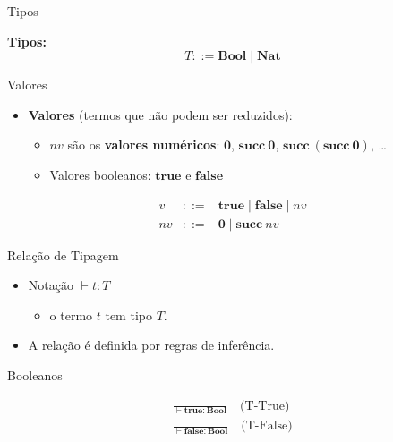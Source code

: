 \begin{frame}{Tipos}

    \textbf{Tipos:} \[T ::= \mathbf{Bool} \mid \mathbf{Nat}\]
\end{frame}

\begin{frame}{Valores}

    \begin{itemize}

        \item
        \textbf{Valores} (termos que não podem ser reduzidos):

        \begin{itemize}

            \item
            \(nv\) são os \textbf{valores numéricos}: \(\mathbf{0}\),
            \(\mathbf{succ}\ \mathbf{0}\),
            \(\mathbf{succ}\ (\mathbf{succ}\ \mathbf{0})\), \ldots{}
            \item
            Valores booleanos: \(\mathbf{true}\) e \(\mathbf{false}\)
        \end{itemize}
    \end{itemize}

    \[\begin{array}{lcl}
    v  & ::= & \mathbf{true} \mid \mathbf{false} \mid nv \\
    nv & ::= & \mathbf{0} \mid \mathbf{succ}\ nv
\end{array}\]
\end{frame}



\begin{frame}{Relação de Tipagem}

    \begin{itemize}

        \item
        Notação \(\vdash t : T\)

        \begin{itemize}

            \item
            o termo \(t\) tem tipo \(T\).
        \end{itemize}
        \item
        A relação é definida por regras de inferência.
    \end{itemize}
\end{frame}

\begin{frame}{Booleanos}

    \[
    \begin{array}{c}
        \frac{}{\vdash \mathbf{true} : \mathbf{Bool}} \quad\text{(T-True)}\\
        \frac{}{\vdash \mathbf{false} : \mathbf{Bool}} \quad\text{(T-False)}
    \end{array}
    \]
\end{frame}

